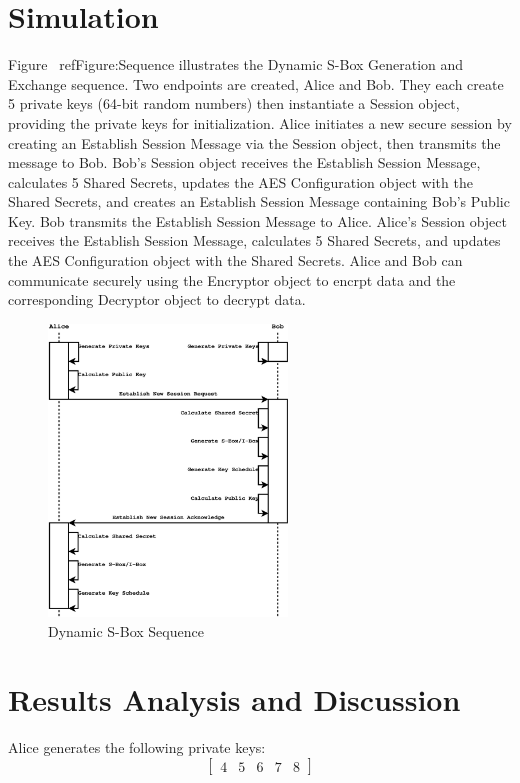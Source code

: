 \documentclass[journal]{IEEEtran}
\begin{document}
\section{Simulation}
Figure ~ref{Figure:Sequence} illustrates the Dynamic S-Box Generation and Exchange sequence. Two endpoints are created, Alice and Bob. They each create 5 private keys (64-bit random numbers) then instantiate a Session object, providing the private keys for initialization. Alice initiates a new secure session by creating an Establish Session Message via the Session object, then transmits the message to Bob. Bob's Session object receives the Establish Session Message, calculates 5 Shared Secrets, updates the AES Configuration object with the Shared Secrets, and creates an Establish Session Message containing Bob's Public Key. Bob transmits the Establish Session Message to Alice. Alice's Session object receives the Establish Session Message, calculates 5 Shared Secrets, and updates the AES Configuration object with the Shared Secrets. Alice and Bob can communicate securely using the Encryptor object to encrpt data and the corresponding Decryptor object to decrypt data.

\begin{figure}[!t]
	\centering
	\includegraphics[width=2.5in]{Sequence}
	\caption{Dynamic S-Box Sequence}
	\label{Figure:Sequence}
\end{figure}

\section{Results Analysis and Discussion}
Alice generates the following private keys:
$$
\begin{bmatrix} 
4 & 5 & 6 & 7 & 8
\end{bmatrix}
$$
\end{document}
